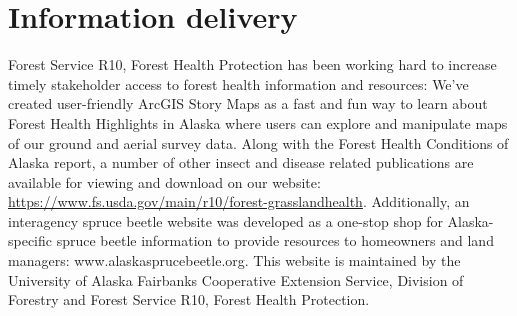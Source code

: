 \section{Information delivery}

 Forest Service R10, Forest Health Protection has been working hard to increase timely stakeholder access to forest health information and resources: We’ve created user-friendly  ArcGIS Story Maps as a fast and fun way to learn about Forest Health Highlights in Alaska where users can explore and manipulate maps of our ground and aerial survey data. Along with the Forest Health Conditions of Alaska report, a number of other insect and disease related publications are available for viewing and download on our website: \url{https://www.fs.usda.gov/main/r10/forest-grasslandhealth}. Additionally, an interagency spruce beetle website was developed as a one-stop shop for Alaska-specific spruce beetle information to provide resources to homeowners and land managers: www.alaskasprucebeetle.org. This website is maintained by the University of Alaska Fairbanks Cooperative Extension Service,  Division of Forestry and  Forest Service R10, Forest Health Protection.


